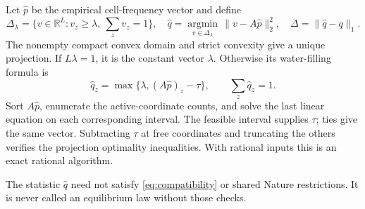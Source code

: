 \documentclass[11pt,a4paper]{article}
\numberwithin{equation}{section}
\theoremstyle{definition}
\newcommand{\R}{\mathbb R}
\begin{document}
Let \(\widehat p\) be the empirical cell-frequency vector and define
\begin{equation}\label{eq:projection}
 \Delta_\lambda=\{v\in\R^L:v_z\ge\lambda,\ \sum_zv_z=1\},
 \quad
 \widehat q=\underset{v\in\Delta_\lambda}{\operatorname{argmin}}\,
                 \|v-A\widehat p\|_2^2,\quad
 \Delta=\|\widehat q-q\|_1.
\end{equation}
The nonempty compact convex domain and strict convexity give a unique
projection. If \(L\lambda=1\), it is the constant vector \(\lambda\).
Otherwise its water-filling formula is
\[
 \widehat q_z=\max\{\lambda,(A\widehat p)_z-\tau\},
 \qquad \sum_z\widehat q_z=1 .
\]
Sort \(A\widehat p\), enumerate the active-coordinate counts, and solve
the last linear equation on each corresponding interval.
The feasible interval supplies \(\tau\); ties give the same vector.
Subtracting \(\tau\) at free coordinates and truncating the others
verifies the projection optimality inequalities. With rational inputs
this is an exact rational algorithm.

The statistic \(\widehat q\) need not satisfy
\eqref{eq:compatibility} or shared Nature restrictions.
It is never called an equilibrium law without those checks.
\end{document}
